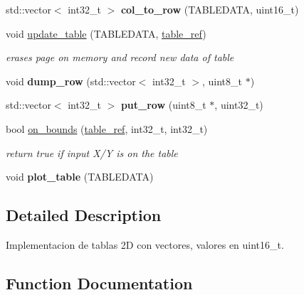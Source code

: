 \begin{DoxyCompactItemize}
\mbox{\label{namespacetables_a7169105f56193c277b88ecc4281a25c2}} 
std\+::vector$<$ int32\+\_\+t $>$ {\bfseries col\+\_\+to\+\_\+row} (T\+A\+B\+L\+E\+D\+A\+TA, uint16\+\_\+t)
\item 
\mbox{\label{namespacetables_a3a6244d3e384337d006dfb252768558a}} 
void \hyperlink{namespacetables_a3a6244d3e384337d006dfb252768558a}{update\+\_\+table} (T\+A\+B\+L\+E\+D\+A\+TA, \hyperlink{structtable__ref}{table\+\_\+ref})
\begin{DoxyCompactList}\small\item\em erases page on memory and record new data of table \end{DoxyCompactList}\item 
\mbox{\label{namespacetables_a3d4eae2328222f2672364baad17b14eb}} 
void {\bfseries dump\+\_\+row} (std\+::vector$<$ int32\+\_\+t $>$, uint8\+\_\+t $\ast$)
\item 
\mbox{\label{namespacetables_aacb653c68579815b85eca89c831e9300}} 
std\+::vector$<$ int32\+\_\+t $>$ {\bfseries put\+\_\+row} (uint8\+\_\+t $\ast$, uint32\+\_\+t)
\item 
\mbox{\label{namespacetables_a5df27daa6f33383e90a21d0ea12f6d9f}} 
bool \hyperlink{namespacetables_a5df27daa6f33383e90a21d0ea12f6d9f}{on\+\_\+bounds} (\hyperlink{structtable__ref}{table\+\_\+ref}, int32\+\_\+t, int32\+\_\+t)
\begin{DoxyCompactList}\small\item\em return true if input X/Y is on the table \end{DoxyCompactList}\item 
\mbox{\label{namespacetables_adaa52c49224ec8a6aac276310d27e702}} 
void {\bfseries plot\+\_\+table} (T\+A\+B\+L\+E\+D\+A\+TA)
\end{DoxyCompactItemize}


\subsection{Detailed Description}
Implementacion de tablas 2D con vectores, valores en uint16\+\_\+t. 

\subsection{Function Documentation}
\mbox{\label{namespacetables_a8a1bab94b65aabe4f2b226cdac58b41f}} 
